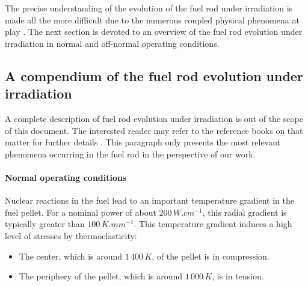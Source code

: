 The precise understanding of the evolution of the fuel rod under
irradiation is made all the more difficult due to the numerous coupled
physical phenomena at play \cite{JRC83478}. The next section is
devoted to an overview of the fuel rod evolution under irradiation in
normal and off-normal operating conditions.

\subsection{A compendium of the fuel rod evolution under irradiation}

A complete description of fuel rod evolution under irradiation is out of
the scope of this document. The interested reader may refer to the
reference books on that matter for further details
\cite{bailly_nuclear_1999, cea_nuclear_2009}. This paragraph only presents
the most relevant phenomena occurring in the fuel rod in the perspective
of our work.

\paragraph{Normal operating conditions}
\label{sec:hho:normal_operating_conditions}

Nuclear reactions in the fuel lead to an important temperature gradient
in the fuel pellet. For a nominal power of about \(200\,W.cm^{-1}\),
this radial gradient is typically greater than \(100\,K.mm^{-1}\). This
temperature gradient induces a high level of stresses by
thermoelasticity:

\begin{itemize}
    \item The center, which is around \(1\,400\, K\), of the pellet is in
    compression.
    \item The periphery of the pellet, which is around \(1\,000\,K\), is in
    tension.
\end{itemize}


